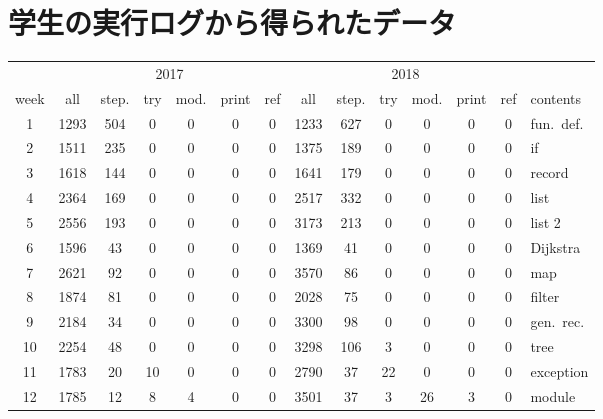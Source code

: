 \chapter{学生の実行ログから得られたデータ}
\begin{table}[h]
\begin{center}
  \begin{tabular}{|c||c|c|c|c|c|c||c|c|c|c|c|c||l|}
    \hline
    & \multicolumn{6}{|c||}{2017} & \multicolumn{6}{|c||}{2018} & \\ \cline{2-13}
    \hspace{-1mm}week\hspace{-1mm} & all & step. & try & \hspace{-1mm}mod.\hspace{-1mm} & \hspace{-1mm}print\hspace{-1mm} & ref
    & all & step. & try & \hspace{-1mm}mod.\hspace{-1mm} & \hspace{-1mm}print\hspace{-1mm} & ref & contents\\ \hline
    1 & 1293 & 504 & 0 & 0 & 0 & 0 & 1233 & 627 & 0 & 0 & 0 & 0 & fun.\ def.\\ \hline
    2 & 1511 & 235 & 0 & 0 & 0 & 0 & 1375 & 189 & 0 & 0 & 0 & 0 & if\\ \hline
    3 & 1618 & 144 & 0 & 0 & 0 & 0 & 1641 & 179 & 0 & 0 & 0 & 0 & record\\ \hline
    4 & 2364 & 169 & 0 & 0 & 0 & 0 & 2517 & 332 & 0 & 0 & 0 & 0 & list\\ \hline
    5 & 2556 & 193 & 0 & 0 & 0 & 0 & 3173 & 213 & 0 & 0 & 0 & 0 & list 2\\ \hline
    6 & 1596 & 43 & 0 & 0 & 0 & 0 & 1369 & 41 & 0 & 0 & 0 & 0 & Dijkstra\\ \hline
    7 & 2621 & 92 & 0 & 0 & 0 & 0 & 3570 & 86 & 0 & 0 & 0 & 0 & map\\ \hline
    8 & 1874 & 81 & 0 & 0 & 0 & 0 & 2028 & 75 & 0 & 0 & 0 & 0 & filter\\ \hline
    9 & 2184 & 34 & 0 & 0 & 0 & 0 & 3300 & 98 & 0 & 0 & 0 & 0 & gen.\ rec.\\ \hline
    10 & 2254 & 48 & 0 & 0 & 0 & 0 & 3298 & 106 & 3 & 0 & 0 & 0 & tree\\ \hline
    11 & 1783 & 20 & 10 & 0 & 0 & 0 & 2790 & 37 & 22 & 0 & 0 & 0 & exception\\ \hline
    12 & 1785 & 12 & 8 & 4 & 0 & 0 & 3501 & 37 & 3 & 26 & 3 & 0 & module\\ \hline

\end{tabular}
\end{center}
\end{table}
